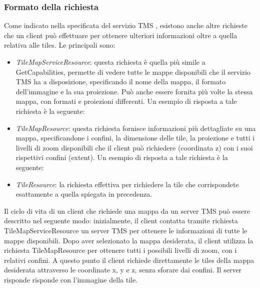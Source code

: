 \subsubsection{Formato della richiesta}

Come indicato nella specificata del servizio TMS \cite{DocumentazioneTMS}, esistono anche altre richieste che un client può effettuare per ottenere ulteriori informazioni oltre a quella relativa alle tiles. Le principali sono:
\begin{itemize}
      \item \textit{TileMapServiceResource}: questa richiesta è quella più simile a GetCapabilities, permette di vedere tutte le mappe disponibili che il servizio TMS ha a disposizione, specificando il nome della mappa, il formato dell'immagine e la sua proiezione. Può anche essere fornita più volte la stessa mappa, con formati e proiezioni differenti. Un esempio di risposta a tale richiesta è la seguente:
            \lstset{basicstyle=\footnotesize\ttfamily}
            
      \item \textit{TileMapResource}: questa richiesta fornisce informazioni più dettagliate su una mappa, specificandone i confini, la dimensione delle tile, la proiezione e tutti i livelli di zoom disponibili che il client può richiedere (coordinata z) con i suoi rispettivi confini (extent). Un esempio di risposta a tale richiesta è la seguente:
            \lstset{basicstyle=\footnotesize\ttfamily}
            
      \item \textit{TileResource}: la richiesta effettiva per richiedere la tile che corrispondete esattamente a quella spiegata in precedenza.
\end{itemize}
Il ciclo di vita di un client che richiede una mappa da un server TMS può essere descritto nel seguente modo:
inizialmente, il client contatta tramite richiesta TileMapServiceResource un server TMS per ottenere le informazioni di tutte le mappe disponibili.
Dopo aver selezionato la mappa desiderata, il client utilizza la richiesta TileMapResource per ottenere tutti i possibili livelli di zoom, con i relativi confini.
A questo punto il client richiede direttamente le tiles della mappa desiderata attraverso le coordinate x, y e z, senza sforare dai confini. Il server risponde risponde con l'immagine della tile.

